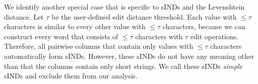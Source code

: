 We identify another special case that is specific to sINDs and the Levenshtein distance.
Let $\tau$ be the user-defined edit distance threshold.
Each value with $\leq \tau$ characters is similar to every other value with $\leq \tau$ characters, because we can construct every word that consists of $\leq \tau$ characters with $\tau$ edit operations.
Therefore, all pairwise columns that contain only values with $\leq \tau$ characters automatically form sINDs.
However, these sINDs do not have any meaning other than that the columns contain only short strings.
We call these sINDs \emph{simple} sINDs and exclude them from our analysis.


